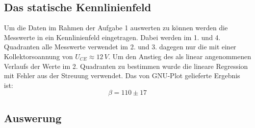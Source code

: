 \subsection{Das statische Kennlinienfeld}
Um die Daten im Rahmen der Aufgabe 1 auswerten zu können werden die Messwerte in ein Kennlinienfeld eingetragen. Dabei werden im 1. und 4. Quadranten alle Messwerte verwendet im 2. und 3. dagegen nur die mit einer Kollektorsoannung von \(U_{CE} \approx 12\,V \). Um den Anstieg des als linear angenommenen Verlaufs der Werte im 2. Quadranten zu bestimmen wurde die lineare Regression mit Fehler aus der Streuung verwendet. Das von GNU-Plot gelieferte Ergebnis ist:
\begin{equation}
\beta = 110 \pm 17
\end{equation}
\begin{center}
\begin{minipage}{\linewidth}
\centering
{}
%
\label{gnuplot_kennlinienfeld}
\end{minipage}
\end{center}
\subsection{Auswerung}